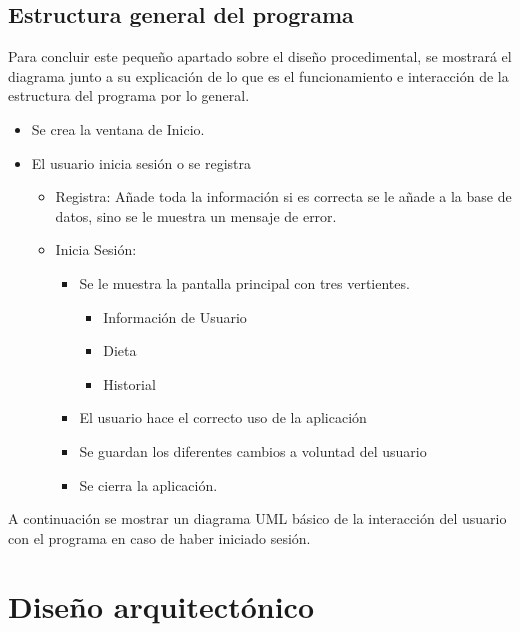 \subsection{Estructura general del programa}
Para concluir este pequeño apartado sobre el diseño procedimental, se mostrará el diagrama junto a su explicación de lo que es el funcionamiento e interacción de la estructura del programa por lo general.
\begin{itemize}
\item Se crea la ventana de Inicio.
\item El usuario inicia sesión o se registra
\begin{itemize}
\item Registra: Añade toda la información si es correcta se le añade a la base de datos, sino se le muestra un mensaje de error.
\item Inicia Sesión:
\begin{itemize}
\item Se le muestra la pantalla principal con tres vertientes.
\begin{itemize}
\item Información de Usuario
\item Dieta
\item Historial
\end{itemize}
\item El usuario hace el correcto uso de la aplicación
\item Se guardan los diferentes cambios a voluntad del usuario
\item Se cierra la aplicación.
\end{itemize}
\end{itemize}
\end{itemize}
A continuación se mostrar un diagrama UML básico de la interacción del usuario con el programa en caso de haber iniciado sesión.
\section{Diseño arquitectónico}


